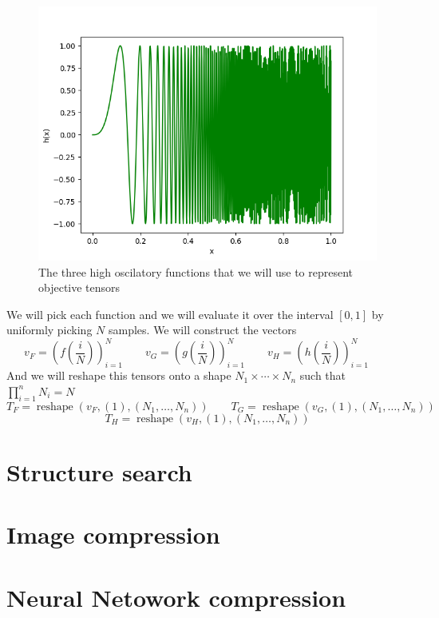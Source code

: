 \documentclass[11pt,a4paper,openright,oneside]{book}
\numberwithin{equation}{section}
\DeclareMathOperator{\reshape}{reshape}
\begin{document}
{\begin{figure}[H]
\begin{adjustwidth}{-30pt}{-30pt}
\begin{minipage}[t]{0.32\linewidth}
        \centering
        \includegraphics[width=\linewidth]{media/h.png}
        \caption*{$h(x)=\sin(1000x^3)$}
    \end{minipage}
\end{adjustwidth}
    \caption{The three high oscilatory functions that we will use to represent objective tensors}
\end{figure}

We will pick each function and we will evaluate it over the interval $[0,1]$ by uniformly picking $N$ samples. We will construct the
vectors 
$$v_F = \left( f\left(\frac{i}{N}\right) \right)_{i=1}^N \qquad
v_G = \left( g\left(\frac{i}{N}\right) \right)_{i=1}^N \qquad
v_H = \left( h\left(\frac{i}{N}\right) \right)_{i=1}^N \qquad$$
And we will reshape this tensors onto a shape $N_1 \times \cdots \times N_n$ such that $\prod_{i=1}^n N_i = N$
$$
T_F = \reshape(v_F, (1), (N_1, \dots, N_n)) \qquad
T_G = \reshape(v_G, (1), (N_1, \dots, N_n))$$
$$T_H = \reshape(v_H, (1), (N_1, \dots, N_n))$$

\section{Structure search}

\section{Image compression}

\section{Neural Netowork compression}

}
\end{document}
